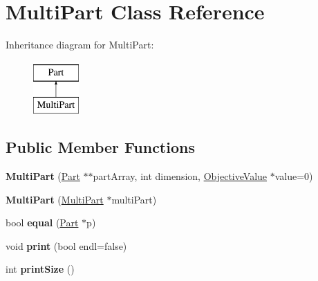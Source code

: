 \hypertarget{classMultiPart}{\section{Multi\-Part Class Reference}
\label{classMultiPart}
}
Inheritance diagram for Multi\-Part\-:\begin{figure}[H]
\begin{center}
\leavevmode
\includegraphics[height=2.000000cm]{classMultiPart}
\end{center}
\end{figure}
\subsection*{Public Member Functions}
\begin{DoxyCompactItemize}
\item 
\hypertarget{classMultiPart_a69dd615086275f61fbc464a45e0e9c20}{{\bfseries Multi\-Part} (\hyperlink{classPart}{Part} $\ast$$\ast$part\-Array, int dimension, \hyperlink{classObjectiveValue}{Objective\-Value} $\ast$value=0)}\label{classMultiPart_a69dd615086275f61fbc464a45e0e9c20}

\item 
\hypertarget{classMultiPart_a5cf49ba2f0caeb02b20dc4c57d78e9db}{{\bfseries Multi\-Part} (\hyperlink{classMultiPart}{Multi\-Part} $\ast$multi\-Part)}\label{classMultiPart_a5cf49ba2f0caeb02b20dc4c57d78e9db}

\item 
\hypertarget{classMultiPart_aae389b0a2cdaf88ce4658ac87eedab97}{bool {\bfseries equal} (\hyperlink{classPart}{Part} $\ast$p)}\label{classMultiPart_aae389b0a2cdaf88ce4658ac87eedab97}

\item 
\hypertarget{classMultiPart_a76ffda0373533f175473385a8fc5b6af}{void {\bfseries print} (bool endl=false)}\label{classMultiPart_a76ffda0373533f175473385a8fc5b6af}

\item 
\hypertarget{classMultiPart_a46d5be2eeff19d9a41a05c21ad16bec0}{int {\bfseries print\-Size} ()}\label{classMultiPart_a46d5be2eeff19d9a41a05c21ad16bec0}

\end{DoxyCompactItemize}
